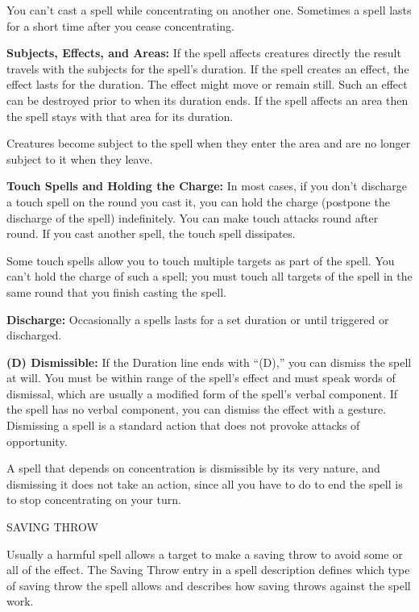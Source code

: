\documentclass{article}
\begin{document}
You can't cast a spell while concentrating on another one. Sometimes a spell lasts 
for a short time after you cease concentrating.

\textbf{Subjects, Effects, and Areas:} If the spell affects creatures directly 
the result travels with the subjects for the spell's duration. If the spell creates 
an effect, the effect lasts for the duration. The effect might move or remain still. 
Such an effect can be destroyed prior to when its duration ends. If the spell affects 
an area then the spell stays with that area for its duration. 

Creatures become subject to the spell when they enter the area and are no longer 
subject to it when they leave.

\textbf{Touch Spells and Holding the Charge:} In most cases, if you don't discharge 
a touch spell on the round you cast it, you can hold the charge (postpone the discharge 
of the spell) indefinitely. You can make touch attacks round after round. If you 
cast another spell, the touch spell dissipates.

Some touch spells\textit{ }allow you to touch multiple targets as part of the spell. 
You can't hold the charge of such a spell; you must touch all targets of the spell 
in the same round that you finish casting the spell.

\textbf{Discharge:} Occasionally a spells lasts for a set duration or until triggered 
or discharged.

\textbf{(D) Dismissible:} If the Duration line ends with ``(D),'' you can dismiss 
the spell at will. You must be within range of the spell's effect and must speak 
words of dismissal, which are usually a modified form of the spell's verbal component. 
If the spell has no verbal component, you can dismiss the effect with a gesture. 
Dismissing a spell is a standard action that does not provoke attacks of opportunity.

A spell that depends on concentration is dismissible by its very nature, and dismissing 
it does not take an action, since all you have to do to end the spell is to stop 
concentrating on your turn.

\vspace{12pt}
SAVING THROW

Usually a harmful spell allows a target to make a saving throw to avoid some or 
all of the effect. The Saving Throw entry in a spell description defines which 
type of saving throw the spell allows and describes how saving throws against the 
spell work.
\end{document}
